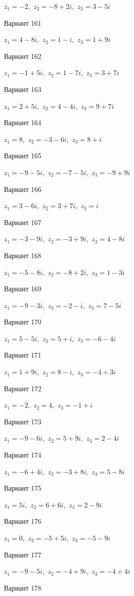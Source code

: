 \documentclass[11pt]{report}
\begin{document}
$z_1 = -2$,\ $z_2 = -8 + 2 i$,\ $z_3 = 3 - 5 i$

Вариант 161

$z_1 = 4 - 8 i$,\ $z_2 = 1 - i$,\ $z_3 = 1 + 9 i$

Вариант 162

$z_1 = -1 + 5 i$,\ $z_2 = 1 - 7 i$,\ $z_3 = 3 + 7 i$

Вариант 163

$z_1 = 2 + 5 i$,\ $z_2 = 4 - 4 i$,\ $z_3 = 9 + 7 i$

Вариант 164

$z_1 = 8$,\ $z_2 = -3 - 6 i$,\ $z_3 = 8 + i$

Вариант 165

$z_1 = -9 - 5 i$,\ $z_2 = -7 - 5 i$,\ $z_3 = -9 + 9 i$

Вариант 166

$z_1 = 3 - 6 i$,\ $z_2 = 3 + 7 i$,\ $z_3 = i$

Вариант 167

$z_1 = -3 - 9 i$,\ $z_2 = -3 + 9 i$,\ $z_3 = 4 - 8 i$

Вариант 168

$z_1 = -5 - 8 i$,\ $z_2 = -8 + 2 i$,\ $z_3 = 1 - 3 i$

Вариант 169

$z_1 = -9 - 3 i$,\ $z_2 = -2 - i$,\ $z_3 = 7 - 5 i$

Вариант 170

$z_1 = 5 - 5 i$,\ $z_2 = 5 + i$,\ $z_3 = -6 - 4 i$

Вариант 171

$z_1 = 1 + 9 i$,\ $z_2 = 8 - i$,\ $z_3 = -4 + 3 i$

Вариант 172

$z_1 = -2$,\ $z_2 = 4$,\ $z_3 = -1 + i$

Вариант 173

$z_1 = -9 - 6 i$,\ $z_2 = 5 + 9 i$,\ $z_3 = 2 - 4 i$

Вариант 174

$z_1 = -6 + 4 i$,\ $z_2 = -3 + 8 i$,\ $z_3 = 5 - 8 i$

Вариант 175

$z_1 = 5 i$,\ $z_2 = 6 + 6 i$,\ $z_3 = 2 - 9 i$

Вариант 176

$z_1 = 0$,\ $z_2 = -5 + 5 i$,\ $z_3 = -5 - 9 i$

Вариант 177

$z_1 = -9 - 5 i$,\ $z_2 = -4 + 9 i$,\ $z_3 = -4 + 4 i$

Вариант 178
\end{document}
